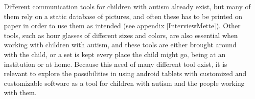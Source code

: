 Different communication tools for children with autism already exist, but many of them rely on a static database of pictures, and often these has to be printed on paper in order to use them as intended (see appendix \ref{InterviewMette}). Other tools, such as hour glasses of different sizes and colors, are also essential when working with children with autism, and these tools are either brought around with the child, or a set is kept every place the child might go, being at an institution or at home.
Because this need of many different tool exist, it is relevant to explore the possibilities in using android tablets with customized and customizable software as a tool for children with autism and the people working with them.